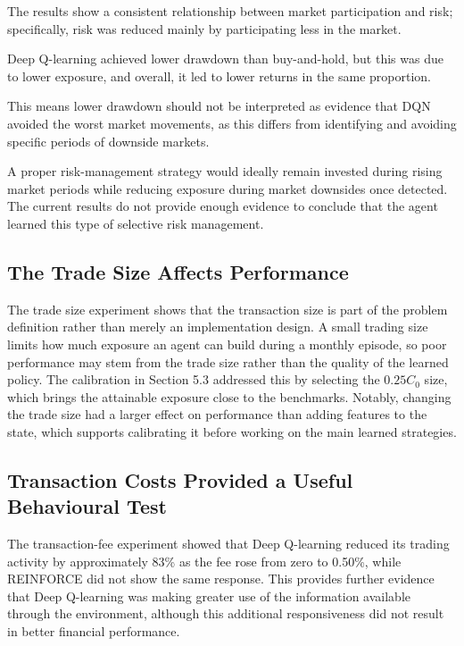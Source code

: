 The results show a consistent relationship between market participation
and risk; specifically, risk was reduced mainly by participating less in
the market.

Deep Q-learning achieved lower drawdown than buy-and-hold, but this was
due to lower exposure, and overall, it led to lower returns in the same
proportion.

This means lower drawdown should not be interpreted as evidence that DQN
avoided the worst market movements, as this differs from identifying and
avoiding specific periods of downside markets.

A proper risk-management strategy would ideally remain invested during
rising market periods while reducing exposure during market downsides
once detected. The current results do not provide enough evidence to
conclude that the agent learned this type of selective risk management.

\subsection{The Trade Size Affects Performance}

The trade size experiment shows that the transaction size is part of the
problem definition rather than merely an implementation design. A small
trading size limits how much exposure an agent can build during a
monthly episode, so poor performance may stem from the trade size rather
than the quality of the learned policy. The calibration in Section 5.3
addressed this by selecting the \(0.25C_{0}\) size, which brings the
attainable exposure close to the benchmark\textquotesingle s. Notably,
changing the trade size had a larger effect on performance than adding
features to the state, which supports calibrating it before working on
the main learned strategies.

\subsection{Transaction Costs Provided a Useful Behavioural Test}

The transaction-fee experiment showed that Deep Q-learning reduced its
trading activity by approximately 83\% as the fee rose from zero to
0.50\%, while REINFORCE did not show the same response. This provides
further evidence that Deep Q-learning was making greater use of the
information available through the environment, although this additional
responsiveness did not result in better financial performance.

